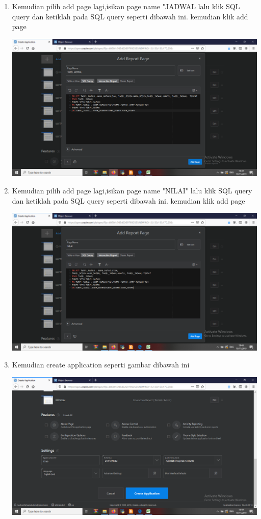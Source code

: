 \begin{enumerate}
     \item Kemudian pilih add page lagi,isikan page name "JADWAL lalu klik SQL query dan ketiklah pada SQL query seperti dibawah ini. kemudian klik add page
	\begin{center}
    \includegraphics[scale=0.2]{Apex/69.png}
    \end{center}
    
    \item Kemudian pilih add page lagi,isikan page name "NILAI" lalu klik SQL query dan ketiklah pada SQL query seperti dibawah ini. kemudian klik add page
	\begin{center}
    \includegraphics[scale=0.2]{Apex/71.png}
    \end{center}
    
     \item Kemudian create application seperti gambar dibawah ini
	\begin{center}
    \includegraphics[scale=0.2]{Apex/73.png}
    \end{center}
    

\end{enumerate}
